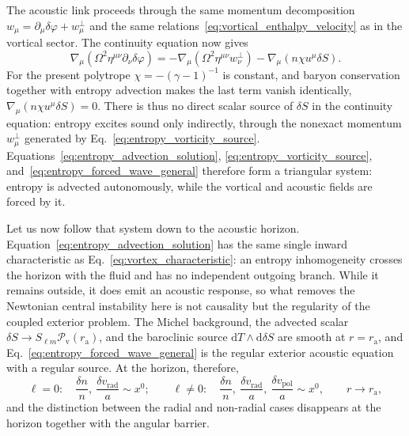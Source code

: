 \documentclass[12pt,a4paper,preprint,nopreprintline]{elsarticle}
\begin{document}
The acoustic link proceeds through the same momentum decomposition $w_{\mu}=\partial_{\mu}\delta\varphi+w_{\mu}^{\perp}$ and the same relations~\eqref{eq:vortical_enthalpy_velocity} as in the vortical sector. The continuity equation now gives
\begin{equation}
    \nabla_{\mu}
    \left(
        \Omega^{2}\eta^{\mu\nu}\partial_{\nu}\delta\varphi
    \right)
    =
    -
    \nabla_{\mu}
    \left(
        \Omega^{2}\eta^{\mu\nu}w_{\nu}^{\perp}
    \right)
    -
    \nabla_{\mu}
    \left(
        n\chi u^{\mu}\delta S
    \right).
    \label{eq:entropy_forced_wave_general}
\end{equation}
For the present polytrope $\chi=-(\gamma-1)^{-1}$ is constant, and baryon conservation together with entropy advection makes the last term vanish identically, $\nabla_{\mu}(n\chi u^{\mu}\delta S)=0$. There is thus no direct scalar source of $\delta S$ in the continuity equation: entropy excites sound only indirectly, through the nonexact momentum $w_{\mu}^{\perp}$ generated by Eq.~\eqref{eq:entropy_vorticity_source}. Equations~\eqref{eq:entropy_advection_solution}, \eqref{eq:entropy_vorticity_source}, and~\eqref{eq:entropy_forced_wave_general} therefore form a triangular system: entropy is advected autonomously, while the vortical and acoustic fields are forced by it.

Let us now follow that system down to the acoustic horizon. Equation~\eqref{eq:entropy_advection_solution} has the same single inward characteristic as Eq.~\eqref{eq:vortex_characteristic}: an entropy inhomogeneity crosses the horizon with the fluid and has no independent outgoing branch. While it remains outside, it does emit an acoustic response, so what removes the Newtonian central instability here is not causality but the regularity of the coupled exterior problem. The Michel background, the advected scalar $\delta S\rightarrow S_{\ell m}\mathcal{P}_{\mathrm{v}}(r_{\mathrm{a}})$, and the baroclinic source $\mathrm{d}T\wedge\mathrm{d}\delta S$ are smooth at $r=r_{\mathrm{a}}$, and Eq.~\eqref{eq:entropy_forced_wave_general} is the regular exterior acoustic equation with a regular source. At the horizon, therefore,
\begin{equation}
    \ell=0:
    \quad
    \frac{\delta n}{n},\
    \frac{\delta v_{\mathrm{rad}}}{a}
    \sim x^{0};
    \qquad
    \ell\neq0:
    \quad
    \frac{\delta n}{n},\
    \frac{\delta v_{\mathrm{rad}}}{a},\
    \frac{\delta v_{\mathrm{pol}}}{a}
    \sim x^{0},
    \qquad
    r \rightarrow r_{\mathrm{a}},
    \label{eq:michel_entropy_horizon_asymptotics}
\end{equation}
and the distinction between the radial and non-radial cases disappears at the horizon together with the angular barrier.
\end{document}
